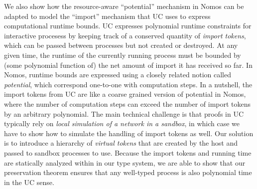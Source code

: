 We also show how the resource-aware ``potential'' mechanism in Nomos can be adapted to model the ``import'' mechanism that UC uses to express computational runtime bounds.
UC expresses polynomial runtime constraints for interactive procesess by keeping track of a conserved quantity of \emph{import tokens}, which can be passed between processes but not created or destroyed. At any given time, the runtime of the currently running process must be bounded by (some polynomial function of) the net amount of import it has received so far.
In Nomos, runtime bounds are expressed using a closely related notion called \emph{potential}, which correspond one-to-one with computation steps. In a nutshell, the import tokens from UC are like a coarse grained version of potential in Nomos, where the number of computation steps can exceed the number of import tokens by an arbitrary polynomial.
The main technical challenge is that proofs in UC typically rely on \emph{local simulation of a network in a sandbox}, in which case we have to show how to simulate the handling of import tokens as well. Our solution is to introduce a hierarchy of \emph{virtual tokens} that are created by the host and passed to sandbox processes to use.
Because the import tokens and running time are statically analyzed within in our type system, we are able to show that our preservation theorem ensures that any well-typed process is also polynomial time in the UC sense.

